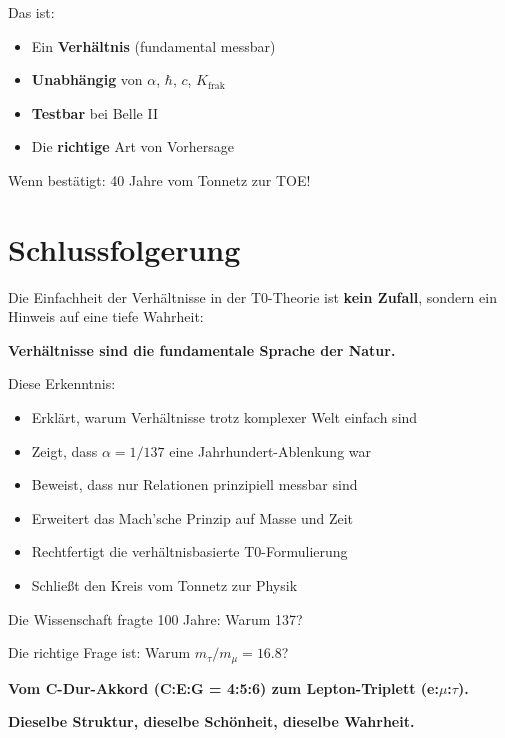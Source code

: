 Das ist:
\begin{itemize}[nosep]
	\item Ein \textbf{Verhältnis} (fundamental messbar)
	\item \textbf{Unabhängig} von $\alpha$, $\hbar$, $c$, $K_\text{frak}$
	\item \textbf{Testbar} bei Belle II
	\item Die \textbf{richtige} Art von Vorhersage
\end{itemize}

Wenn bestätigt: 40 Jahre vom Tonnetz zur TOE!

\section{Schlussfolgerung}

\begin{tcolorbox}[colback=blue!5!white,colframe=blue!75!black,title=\textbf{Schlussfolgerung}]
	Die Einfachheit der Verhältnisse in der T0-Theorie ist \textbf{kein Zufall}, sondern ein Hinweis auf eine tiefe Wahrheit:
	
	\textbf{Verhältnisse sind die fundamentale Sprache der Natur.}
	
	Diese Erkenntnis:
	\begin{itemize}[nosep]
		\item Erklärt, warum Verhältnisse trotz komplexer Welt einfach sind
		\item Zeigt, dass $\alpha = 1/137$ eine Jahrhundert-Ablenkung war
		\item Beweist, dass nur Relationen prinzipiell messbar sind
		\item Erweitert das Mach'sche Prinzip auf Masse und Zeit
		\item Rechtfertigt die verhältnisbasierte T0-Formulierung
		\item Schließt den Kreis vom Tonnetz zur Physik
	\end{itemize}
	
	\vspace{0.5cm}
	
	Die Wissenschaft fragte 100 Jahre: Warum 137?
	
	Die richtige Frage ist: Warum $m_\tau/m_\mu = 16.8$?
	
	\vspace{0.5cm}
	
	\textbf{Vom C-Dur-Akkord (C:E:G = 4:5:6) zum Lepton-Triplett (e:$\mu$:$\tau$).}
	
	\textbf{Dieselbe Struktur, dieselbe Schönheit, dieselbe Wahrheit.}
\end{tcolorbox}


